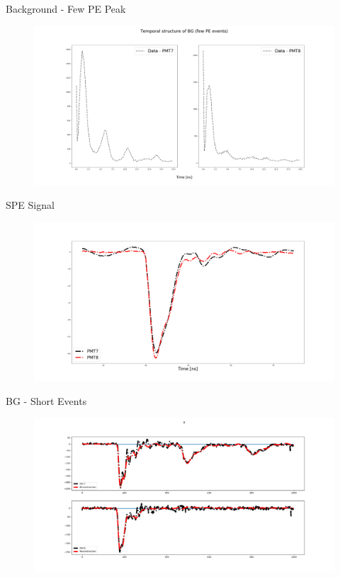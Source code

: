 \documentclass{beamer}
\begin{document}
\begin{frame}{Background - Few PE Peak}
\begin{figure}[h]
\includegraphics[width=1\textwidth]{BG_temp.png}
\end{figure}
\end{frame}


\begin{frame}{SPE Signal}
\begin{figure}[h]
\includegraphics[width=1\textwidth]{SPE.png}
\end{figure}
\end{frame}

\begin{frame}{BG - Short Events}
\begin{figure}[h]
\includegraphics[width=1\textwidth]{event1.png}
\end{figure}
\end{frame}
\end{document}
